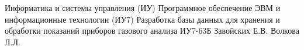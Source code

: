 \documentclass{bmstu}
\begin{document}
\makecourseworktitle
	{Информатика и системы управления (ИУ)}
	{Программное обеспечение ЭВМ и информационные технологии (ИУ7)}
	{Разработка базы данных для хранения и обработки показаний приборов газового анализа}
	{ИУ7-63Б}
	{Завойских Е.В.}
	{Волкова Л.Л.}{}{}



\maketableofcontents








\makebibliography
\end{document}
